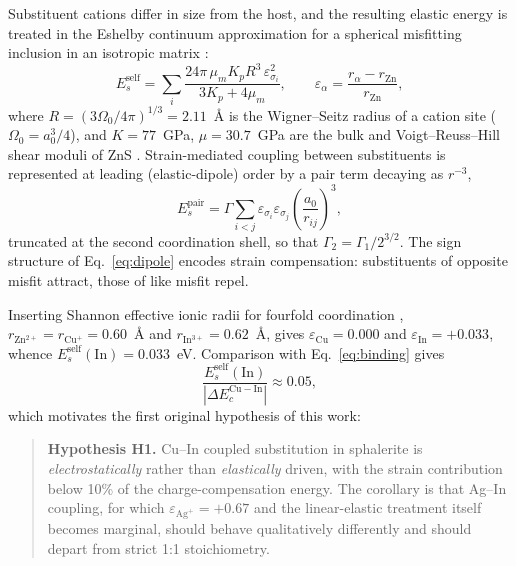 \documentclass[11pt,a4paper]{article}
\begin{document}
Substituent cations differ in size from the host, and the resulting elastic
energy is treated in the Eshelby continuum approximation for a spherical
misfitting inclusion in an isotropic matrix \citep{eshelby1957}:
\begin{equation}
E_s^{\mathrm{self}} = \sum_i \frac{24\pi\, \mu_m K_p R^3\, \varepsilon_{\sigma_i}^2}{3K_p + 4\mu_m},
\qquad
\varepsilon_\alpha = \frac{r_\alpha - r_{\mathrm{Zn}}}{r_{\mathrm{Zn}}},
\label{eq:eshelby}
\end{equation}
where $R = (3\Omega_0/4\pi)^{1/3} = 2.11$~\AA{} is the Wigner--Seitz radius of a
cation site ($\Omega_0 = a_0^3/4$), and $K = 77$~GPa, $\mu = 30.7$~GPa are the
bulk and Voigt--Reuss--Hill shear moduli of ZnS \citep{berlincourt1963}.
Strain-mediated coupling between
substituents is represented at leading (elastic-dipole) order by a pair term
decaying as $r^{-3}$,
\begin{equation}
E_s^{\mathrm{pair}} = \Gamma \sum_{i<j} \varepsilon_{\sigma_i}\varepsilon_{\sigma_j}
\left( \frac{a_0}{r_{ij}} \right)^{3},
\label{eq:dipole}
\end{equation}
truncated at the second coordination shell, so that
$\Gamma_2 = \Gamma_1 / 2^{3/2}$. The sign structure of Eq.~\eqref{eq:dipole}
encodes strain compensation: substituents of opposite misfit attract, those of
like misfit repel.

Inserting Shannon effective ionic radii for fourfold coordination
\citep{shannon1976},
$r_{\mathrm{Zn^{2+}}} = r_{\mathrm{Cu^{+}}} = 0.60$~\AA{} and
$r_{\mathrm{In^{3+}}} = 0.62$~\AA{}, gives $\varepsilon_{\mathrm{Cu}} = 0.000$
and $\varepsilon_{\mathrm{In}} = +0.033$, whence
$E_s^{\mathrm{self}}(\mathrm{In}) = 0.033$~eV. Comparison with
Eq.~\eqref{eq:binding} gives
\begin{equation}
\frac{E_s^{\mathrm{self}}(\mathrm{In})}{\left| \Delta E_c^{\mathrm{Cu-In}} \right|} \approx 0.05 ,
\end{equation}
which motivates the first original hypothesis of this work:

\begin{quote}
\textbf{Hypothesis H1.} Cu--In coupled substitution in sphalerite is
\emph{electrostatically} rather than \emph{elastically} driven, with the strain
contribution below 10\% of the charge-compensation energy. The corollary is that
Ag--In coupling, for which $\varepsilon_{\mathrm{Ag^{+}}} = +0.67$ and the
linear-elastic treatment itself becomes marginal, should behave qualitatively
differently and should depart from strict 1:1 stoichiometry.
\end{quote}
\end{document}
